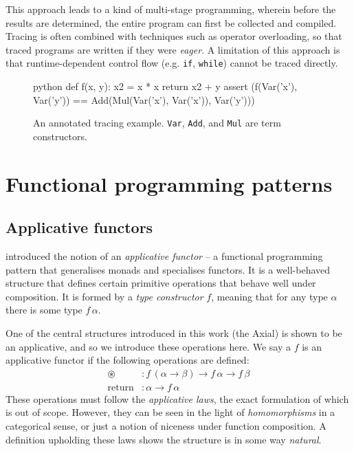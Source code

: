 This approach leads to a kind of multi-stage programming, wherein before the results are determined, the entire program can first be collected and compiled. Tracing is often combined with techniques such as operator overloading, so that traced programs are written if they were \textit{eager}. A limitation of this approach is that runtime-dependent control flow (e.g. \texttt{if}, \texttt{while}) cannot be traced directly.


\begin{figure}
    \centering
    \begin{cminted}{python}
def f(x, y):
    x2 = x * x
    return x2 + y
assert (f(Var('x'), Var('y')) 
        == Add(Mul(Var('x'), Var('x')), Var('y')))
    \end{cminted}
    \caption{An annotated tracing example. \texttt{Var}, \texttt{Add}, and \texttt{Mul} are term constructors.}
    \label{fig:tracing}
\end{figure}

\section{Functional programming patterns}
\label{functional-programming-patterns}

\subsection{Applicative functors}

\textcite{mcbride2008applicative} introduced the notion of an \textit{applicative functor} -- a functional programming pattern that generalises monads and specialises functors. It is a well-behaved structure that defines certain primitive operations that behave well under composition. It is formed by a \textit{type constructor} $f$, meaning that for any type $\alpha$ there is some type $f\,\alpha$.

One of the central structures introduced in this work (the Axial) is shown to be an applicative, and so we introduce these operations here. We say a $f$ is an applicative functor if the following operations are defined:
\begin{align*}
\circledast &: f\,(\alpha \to \beta) \to f\,\alpha \to f\,\beta \\
\mathrm{return} &: \alpha \to f\,\alpha
\end{align*}
These operations must follow the \textit{applicative laws}, the exact formulation of which is out of scope. However, they can be seen in the light of \textit{homomorphisms} in a categorical sense, or just a notion of niceness under function composition. A definition upholding these laws shows the structure is in some way \textit{natural}. 

